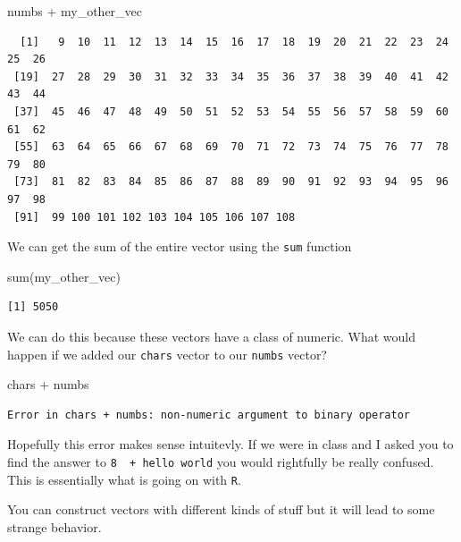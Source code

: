 \documentclass[
  letterpaper,
  DIV=11,
  numbers=noendperiod,
  oneside]{scrreprt}
\newenvironment{Shaded}{\begin{snugshade}}{\end{snugshade}}
\newcommand{\FunctionTok}[1]{\textcolor[rgb]{0.28,0.35,0.67}{#1}}
\newcommand{\NormalTok}[1]{\textcolor[rgb]{0.00,0.23,0.31}{#1}}
\newcommand{\SpecialCharTok}[1]{\textcolor[rgb]{0.37,0.37,0.37}{#1}}
\begin{document}
\begin{Shaded}
\begin{Highlighting}[]
\NormalTok{numbs }\SpecialCharTok{+}\NormalTok{ my\_other\_vec}
\end{Highlighting}
\end{Shaded}

\begin{verbatim}
  [1]   9  10  11  12  13  14  15  16  17  18  19  20  21  22  23  24  25  26
 [19]  27  28  29  30  31  32  33  34  35  36  37  38  39  40  41  42  43  44
 [37]  45  46  47  48  49  50  51  52  53  54  55  56  57  58  59  60  61  62
 [55]  63  64  65  66  67  68  69  70  71  72  73  74  75  76  77  78  79  80
 [73]  81  82  83  84  85  86  87  88  89  90  91  92  93  94  95  96  97  98
 [91]  99 100 101 102 103 104 105 106 107 108
\end{verbatim}

We can get the sum of the entire vector using the \texttt{sum} function

\begin{Shaded}
\begin{Highlighting}[]
\FunctionTok{sum}\NormalTok{(my\_other\_vec)}
\end{Highlighting}
\end{Shaded}

\begin{verbatim}
[1] 5050
\end{verbatim}

We can do this because these vectors have a class of numeric. What would
happen if we added our \texttt{chars} vector to our \texttt{numbs}
vector?

\begin{Shaded}
\begin{Highlighting}[]
\NormalTok{chars }\SpecialCharTok{+}\NormalTok{ numbs }
\end{Highlighting}
\end{Shaded}

\begin{verbatim}
Error in chars + numbs: non-numeric argument to binary operator
\end{verbatim}

Hopefully this error makes sense intuitevly. If we were in class and I
asked you to find the answer to \texttt{8\ \ +\ hello\ world} you would
rightfully be really confused. This is essentially what is going on with
\texttt{R}.

You can construct vectors with different kinds of stuff but it will lead
to some strange behavior.
\end{document}
